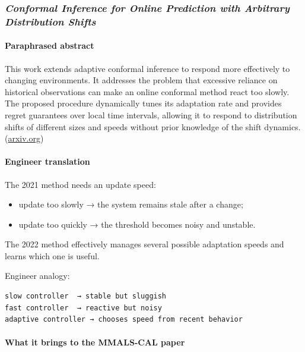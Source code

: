 \subsubsection{\texorpdfstring{\emph{Conformal Inference for Online Prediction with Arbitrary Distribution Shifts}}{Conformal Inference for Online Prediction with Arbitrary Distribution Shifts}}\label{conformal-inference-for-online-prediction-with-arbitrary-distribution-shifts}

\paragraph{Paraphrased abstract}\label{paraphrased-abstract-4}

This work extends adaptive conformal inference to respond more effectively to changing environments. It addresses the problem that excessive reliance on historical observations can make an online conformal method react too slowly. The proposed procedure dynamically tunes its adaptation rate and provides regret guarantees over local time intervals, allowing it to respond to distribution shifts of different sizes and speeds without prior knowledge of the shift dynamics. (\href{https://arxiv.org/abs/2208.08401?utm_source=chatgpt.com}{arxiv.org})

\paragraph{Engineer translation}\label{engineer-translation-4}

The 2021 method needs an update speed:

\begin{itemize}
\tightlist
\item
  update too slowly → the system remains stale after a change;
\item
  update too quickly → the threshold becomes noisy and unstable.
\end{itemize}

The 2022 method effectively manages several possible adaptation speeds and learns which one is useful.

Engineer analogy:

\begin{lstlisting}
slow controller  → stable but sluggish
fast controller  → reactive but noisy
adaptive controller → chooses speed from recent behavior
\end{lstlisting}

\paragraph{What it brings to the MMALS-CAL paper}\label{what-it-brings-to-the-mmals-cal-paper-4}

